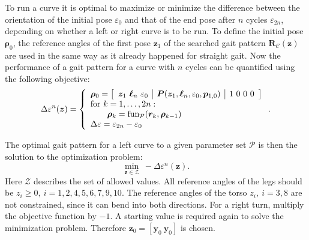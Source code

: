 \documentclass[letterpaper,10pt,conference]{ieeeconf}  %
\begin{document}
To run a curve it is optimal to maximize or minimize the difference between the orientation of the initial pose $\varepsilon_0$ and that of the end pose after $n$ cycles $\varepsilon_{2n}$, depending on whether a left or right curve is to be run.
To define the initial pose $\bm{\rho}_0$, the reference angles of the first pose $\bm{z}_1$ of the searched gait pattern $\bm{R}_\mathcal{C}(\bm{z})$ are used in the same way as it already happened for straight gait.
Now the performance of a gait pattern for a curve with $n$ cycles can be quantified using the following objective:
\begin{equation}
\Delta\varepsilon^n(\bm{z})
 = 
\left\lbrace
\begin{array}{l}
\bm{\rho}_0 = 
\left[
\begin{array}{c|c|c}
\bm{z}_1 ~ \bm{\ell}_n ~ \varepsilon_0  & 
\bm{P}(\bm{z}_1, \bm{\ell}_n, \varepsilon_0, \bm{p}_{1,0}) & 
1~0~0~0
\end{array}
\right] \\
\textnormal{for } k = 1, \dots, 2n: \\
\qquad \bm{\rho}_k = \textnormal{fun}_{\mathcal{P}}(\bm{r}_k, \bm{\rho}_{k-1}) \\
\Delta \varepsilon = \varepsilon_{2n} - \varepsilon_0 \\
\end{array}
\right. .
\end{equation}

The optimal gait pattern for a left curve to a given parameter set $\mathcal{P}$ is then the solution to the optimization problem:
\begin{equation}
\min_{\bm{z} \in \mathcal{Z}} ~ -\Delta\varepsilon^n(\bm{z}).
\end{equation}
Here $\mathcal{Z}$ describes the set of allowed values.
All reference angles of the legs should be $z_i\geq0,~i=1,2,4,5,6,7,9,10$. 
The reference angles of the torso $z_i,~i=3,8$ are not constrained, since it can bend into both directions.
For a right turn, multiply the objective function by $-1$.
A starting value is required again to solve the minimization problem.
Therefore $\bm{z}_0 = [\bm{y}_0~\bm{y}_0]$ is chosen.
\end{document}
